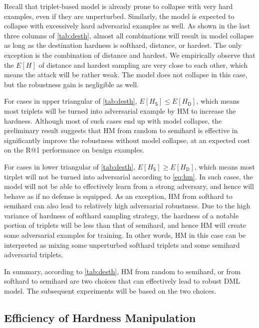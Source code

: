 \documentclass[10pt,twocolumn,letterpaper]{article}
\begin{document}

Recall that triplet-based model is already prone to collapse with very hard
examples, even if they are unperturbed.
%
Similarly, the model is expected to collapse with excessively hard adversarial
examples as well.
%
As shown in the last three columns of \cref{tab:desth}, almost all combinations
will result in model collapse as long as the destination hardness is softhard,
distance, or hardest.
%
The only exception is the combination of distance and hardest.
%
We empirically observe that the $E[H]$ of distance and hardest sampling are
very close to each other, which means the attack will be rather weak.
%
The model does not collapse in this case, but the robustness gain is negligible
as well.


For cases in upper triangular of \cref{tab:desth}, $E[H_\mathsf{S}] \leqslant E[H_\mathsf{D}]$,
which means most triplets will be turned into adversarial example by HM
to increase the hardness.
%
Although most of such cases end up with model collapse, the preliminary 
result suggests that HM from random to semihard is effective in significantly
improve the robustness without model collapse, at an expected cost on the R@1
performance on benign examples.

For cases in lower triangular of \cref{tab:desth}, $E[H_\mathsf{S}] \geqslant E[H_\mathsf{D}]$,
which means most tirplet will not be turned into adversarial according to
\cref{eq:hm}.
%
In such cases, the model will not be able to effectively learn from a strong
adversary, and hence will behave as if no defense is equipped.
%
As an exception, HM from softhard to semihard can also lead to relatively high
adversarial robustness.
%
Due to the high variance of hardness of softhard sampling strategy, the
hardness of a notable portion of triplets will be less than that of semihard,
and hence HM will create some adversarial examples for training.
%
In other words, HM in this case can be interpreted as mixing some unperturbed
softhard triplets and some semihard adversarial triplets.


In summary, according to \cref{tab:desth}, HM from random to semihard, or from
softhard to semihard are two choices that can effectively lead to robust
DML model.
%
The subsequent experiments will be based on the two choices.

\subsection{Efficiency of Hardness Manipulation}
\label{sec:42}
\end{document}
